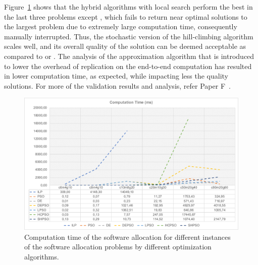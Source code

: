 Figure~\ref{fig_allocationtime_ilp_metaheuristic} shows that the hybrid \pso{} algorithms with local search perform the best in the last three problems except \hcpso{}, which fails to return near optimal solutions to the largest problem  due to extremely large computation time, consequently manually interrupted. Thus, the stochastic version of the hill-climbing algorithm scales well, and its overall quality of the solution can be deemed acceptable as compared to \ilp{} or \hcpso. The analysis of the approximation algorithm that is introduced to lower the overhead of replication on the end-to-end computation has resulted in lower computation time, as expected, while impacting less the quality solutions. For more of the validation results and analysis, refer Paper F~\cite{Mahmud2019OptimizedConstraints}.
\begin{figure}[h]
	\centering
	\includegraphics[width=0.9\linewidth]{images/time_summary.pdf}
	\caption{Computation time of the software allocation for different instances of the software allocation problems by different optimization algorithms.}
	\label{fig_allocationtime_ilp_metaheuristic}\vspace{-0.4cm}
\end{figure}


